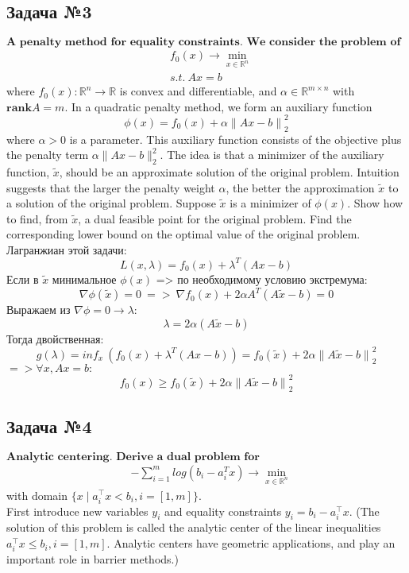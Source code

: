 \documentclass[12pt,letterpaper]{article}
\begin{document}
\subsection*{Задача №3}
$\textbf{A penalty method for equality constraints. We consider the problem of minimization}$
$$\begin{aligned}
&f_0(x) \rightarrow \min _{x \in \mathbb{R}^n} \\
&s.t.\ Ax=b
\end{aligned} $$
where \(f_0(x): \mathbb{R}^n \to\mathbb{R}\) is convex and differentiable, and \(\alpha \in \mathbb{R}^{m \times n}\) with \(\mathbf{rank }A = m\). In a quadratic penalty method, we form an auxiliary function
$$\phi(x)=f_0(x)+\alpha{\parallel Ax-b\parallel}^2_2$$
where \(\alpha > 0\) is a parameter. This auxiliary function consists of the objective plus the penalty term \(\alpha \|Ax - b\|_2^2\). The idea is that a minimizer of the auxiliary function, \(\tilde{x}\), should be an approximate solution of the original problem. Intuition suggests that the larger the penalty weight \(\alpha\), the better the approximation \(\tilde{x}\) to a solution of the original problem. Suppose \(\tilde{x}\) is a minimizer of \(\phi(x)\). Show how to find, from \(\tilde{x}\), a dual feasible point for the original problem. Find the corresponding lower bound on the optimal value of the original problem.\\

Лагранжиан этой задачи:
$$L(x,\lambda)=f_0(x)+{\lambda}^T(Ax-b)$$
Если в \(\tilde{x}\) минимальное $\phi(x)$ => по необходимому условию экстремума:
$$\nabla\phi(\tilde{x})=0\ =>\ \nabla f_0(x)+2\alpha A^T(A\tilde{x}-b)=0$$
Выражаем из $\nabla\phi=0 \rightarrow \lambda:$
$$\lambda=2\alpha(A\tilde{x}-b)$$
Тогда двойственная:
$$g(\lambda)={inf}_x\ (f_0(x)+{\lambda}^T(Ax-b))=f_0(\tilde{x})+2\alpha{\parallel A\tilde{x}-b\parallel}^2_2$$
$=> \forall x, Ax=b:$
$$f_0(x)\geqslant f_0(\tilde{x})+2\alpha{\parallel A\tilde{x}-b\parallel}^2_2$$


\subsection*{Задача №4}
$\textbf{Analytic centering. Derive a dual problem for}$
$$\begin{aligned}
&-\sum^{m}_{i=1}log(b_i-a^T_ix) \rightarrow \min _{x \in \mathbb{R}^n}
\end{aligned} $$
with domain \(\{x \mid a^\top_i x < b_i , i = [1,m]\}\).\\
First introduce new variables \(y_i\) and equality constraints \(y_i = b_i-a^\top_i x\). (The solution of this problem is called the analytic center of the linear inequalities \(a^\top_i x \leq b_i ,i = [1,m]\). Analytic centers have geometric applications, and play an important role in barrier methods.)\\
\end{document}
